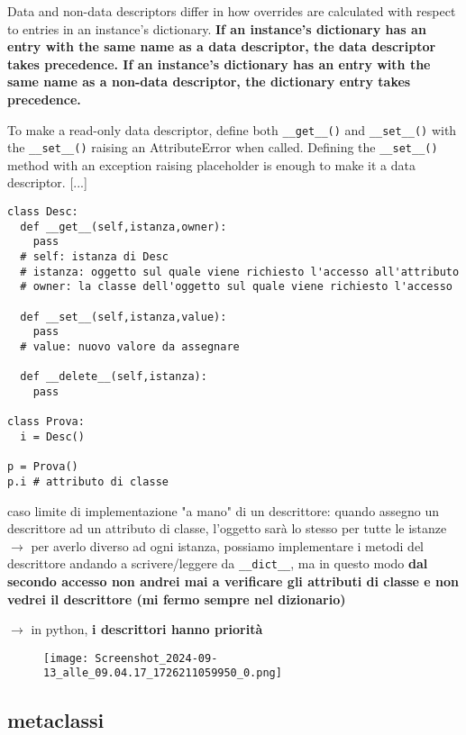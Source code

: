 Data and non-data descriptors differ in how overrides are calculated with respect to entries in an instance's dictionary. \textbf{If an instance's dictionary has an entry with the same name as a data descriptor, the data descriptor takes precedence. If an instance's dictionary has an entry with the same name as a non-data descriptor, the dictionary entry takes precedence.}

To make a read-only data descriptor, define both \texttt{__get__()} and \texttt{__set__()} with the \texttt{__set__()} raising an AttributeError when called. Defining the \texttt{__set__()} method with an exception raising placeholder is enough to make it a data descriptor. [...]

\begin{verbatim}
class Desc:
  def __get__(self,istanza,owner):
    pass
  # self: istanza di Desc
  # istanza: oggetto sul quale viene richiesto l'accesso all'attributo
  # owner: la classe dell'oggetto sul quale viene richiesto l'accesso
  
  def __set__(self,istanza,value):
    pass
  # value: nuovo valore da assegnare
  
  def __delete__(self,istanza):
    pass
  
class Prova:
  i = Desc()
  
p = Prova()
p.i # attributo di classe
\end{verbatim}

caso limite di implementazione "a mano" di un descrittore: quando assegno un descrittore ad un attributo di classe, l'oggetto sar\`a lo stesso per tutte le istanze $\rightarrow$ per averlo diverso ad ogni istanza, possiamo implementare i metodi del descrittore andando a scrivere/leggere da \texttt{__dict__}, ma in questo modo \textbf{dal secondo accesso non andrei mai a verificare gli attributi di classe e non vedrei il descrittore (mi fermo sempre nel dizionario)}

$\rightarrow$ in python, \textbf{i descrittori hanno priorit\`a}

\begin{figure}[h]
\centering
\texttt{[image: Screenshot\_2024-09-13\_alle\_09.04.17\_1726211059950\_0.png]}
\end{figure}

\subsection{metaclassi}

